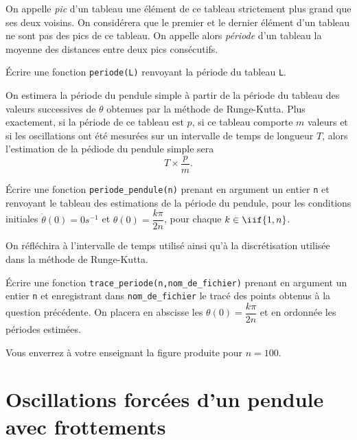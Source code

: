 \medskip{}

On appelle \emph{pic} d'un tableau une élément de ce tableau strictement plus grand que ses deux voisins. 
On considérera que le premier et le dernier élément d'un tableau ne sont pas des pics de ce tableau. 
On appelle alors \emph{période} d'un tableau la moyenne des distances entre deux pics consécutifs. 

\medskip{}

\question{} \'Ecrire une fonction \texttt{periode(L)} renvoyant la période du tableau \texttt{L}.

\medskip{}

On estimera la période du pendule simple à partir de la période du tableau des valeurs successives de $\theta$ obtenues par la méthode de Runge-Kutta. 
Plus exactement, si la période de ce tableau est $p$, si ce tableau comporte $m$ valeurs et si les oscillations ont été mesurées sur un intervalle de temps de longueur $T$, alors l'estimation de la pédiode du pendule simple sera 
\begin{equation*}
    T \times \dfrac{p}{m}.
\end{equation*}


\medskip{}

\question{} \'Ecrire une fonction \texttt{periode\_pendule(n)} prenant en argument un entier \texttt{n} et renvoyant le tableau des estimations de la période du pendule, pour les conditions initiales $\dot{\theta}(0) = 0s^{-1}$ et $\theta(0) = \dfrac{k\pi}{2n}$, pour chaque $k \in \iif{1,n}$.

\medskip{}

On réfléchira à l'intervalle de temps utilisé ainsi qu'à la discrétisation utilisée dans la méthode de Runge-Kutta.

\medskip{}

\question{\label{qu:periode}} \'Ecrire une fonction \texttt{trace\_periode(n,nom\_de\_fichier)} prenant en argument un entier \texttt{n} et enregistrant dans \texttt{nom\_de\_fichier} le tracé des points obtenus à la question précédente. 
  On placera en abscisse les $\theta(0) = \dfrac{k\pi}{2n}$ et en ordonnée les périodes estimées.

  Vous enverrez à votre enseignant la figure produite pour $n=100$.
  
\section{Oscillations forcées d'un pendule avec frottements}

